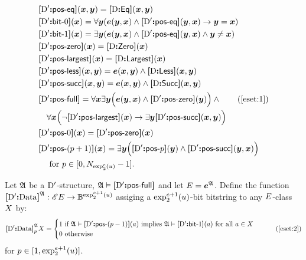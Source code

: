 \begin{align}
  &\fposeq\DSp(\xx,\yy) = \fEq\DS(\xx,\yy) \nonumber \\
  &\fbitO\DSp(\xx) = \forall\yy(\se(\yy,\xx) \land 
    \fposeq\DSp(\yy,\xx) \limp \yy = \xx) \nonumber \\
  &\fbitI\DSp(\xx) = \exists\yy(\se(\yy,\xx) \land
    \fposeq\DSp(\yy,\xx) \land \yy \neq \xx) \nonumber \\
  &\fposzero\DSp(\xx) = \fZero\DS(\xx) \nonumber \\
  &\fposmax\DSp(\xx) = \fLargest\DS(\xx) \nonumber \\
  &\fposless\DSp(\xx,\yy) = \se(\xx,\yy) \land
    \fLess\DS(\xx,\yy) \nonumber \\
  &\fpossucc\DSp(\xx,\yy) = \se(\xx,\yy) \land
    \fSucc\DS(\xx,\yy) \nonumber \\
  &\fposfull\DSp = \forall\xx\exists\yy\Big(\se(\yy,\xx) \land 
    \fposzero\DSp(\yy)\Big) \land \tag{\ref{eset:1}}\\
    &\quad\forall\xx\Big(\lnot\fposmax\DSp(\xx) \limp
    \exists\yy\fpossucc\DSp(\xx,\yy)\Big) \nonumber \\
  &\fposA\DSp0(\xx) = \fposzero\DSp(\xx) \nonumber \\
  &\fposA\DSp{(\posp+1)}(\xx) = \exists\yy\Big(
    \fposA\DSp\posp(\yy) \land \fpossucc\DSp(\yy,\xx)
  \Big) \nonumber \\
    &\quad\text{ for } \posp \in [0,\largtbit{\tetr\sze2\szu}-1].\nonumber
\end{align}

Let $\StrA$ be a $\DSp$-structure, $\StrA \vDash \fposfull\DSp$ and let
$\relE=\at\StrA\se$.
Define the function $\Data\DSp\StrA : \Ecl\relE \to
\tBitstrings{\tetr{\sze+1}2\szu}$ assiging a $\tetr{\sze+1}2\szu$-bit
bitstring to any $\relE$-class $\eclX$ by:
\begin{equation}
  \Data\DSp\StrA_\posp\eclX = \begin{cases}
  1 \text{ if } \StrA \vDash \fposA\DSp{(\posp-1)}(\ea) 
  \text{ implies } \StrA \vDash \fbitI\DSp(\ea)
  \text{ for all } \ea \in \eclX
  \\
  0 \text{ otherwise}
  \end{cases}\tag{\ref{eset:2}}
\end{equation}
for $\posp \in [1,\tetr{\sze+1}2\szu]$.

